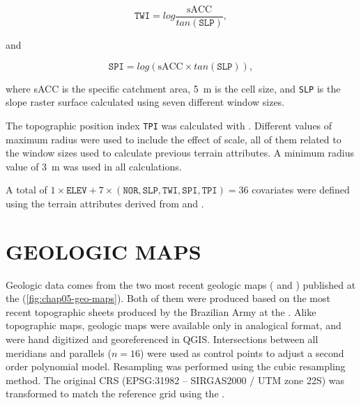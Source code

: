 \begin{equation}\label{eqn:TWI}
 \texttt{TWI} = log \dfrac{\text{sACC}}{tan(\texttt{SLP})},
\end{equation}

\noindent and

\begin{equation}\label{eqn:SPI}
 \texttt{SPI} = log(\text{sACC} \times tan(\texttt{SLP})),
\end{equation}

\noindent where sACC is the specific catchment area, \SI{5}{\m} is the cell size, and \texttt{SLP} is the 
slope 
raster surface calculated using seven different window sizes.

The topographic position index \texttt{TPI} was calculated with . Different values of 
maximum radius were used to include the effect of scale, all of them related to the window sizes used to 
calculate previous terrain attributes. A minimum radius value of \SI{3}{\m} was used in all calculations.

A total of $1 \times \texttt{ELEV} + 7 \times (\texttt{NOR}, \texttt{SLP}, \texttt{TWI}, \texttt{SPI}, 
\texttt{TPI}) = 36$ covariates 
were defined using the terrain attributes derived from \demOld{} and \demNew{}.

\section{GEOLOGIC MAPS}
\label{sec:chap05-geo-maps}

Geologic data comes from the two most recent geologic maps (\geoOld{} and \geoNew{}) published at the 
 \cite{GasparettoEtAl1988, MacielFilho1990} (\autoref{fig:chap05-geo-maps}). Both of 
them were produced based on the most recent topographic sheets produced by the Brazilian Army at the 
 \cite{DSG1980, DSG1992, DSG1992a}. Alike topographic maps, geologic maps were 
available only in analogical format, and were hand digitized and georeferenced in QGIS. Intersections 
between all meridians and parallels ($n = 16$) were used as control points to adjust a second order polynomial 
model. Resampling was performed using the cubic resampling method. The original CRS 
(EPSG:31982 -- SIRGAS2000 / UTM zone 22S) was transformed to match the reference grid using the 
 \cite{BivandEtAl2013a}.

